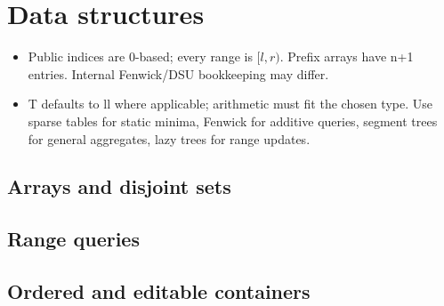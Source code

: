 \chapter{Data structures}
\begin{itemize}[nosep,leftmargin=*]
\item Public indices are 0-based; every range is $[l,r)$.
 Prefix arrays have n+1 entries. Internal Fenwick/DSU bookkeeping may differ.
\item T defaults to ll where applicable; arithmetic must fit the chosen type.
 Use sparse tables for static minima, Fenwick for additive queries,
 segment trees for general aggregates, lazy trees for range updates.
\end{itemize}
\section{Arrays and disjoint sets}
\section{Range queries}
\section{Ordered and editable containers}
\par
